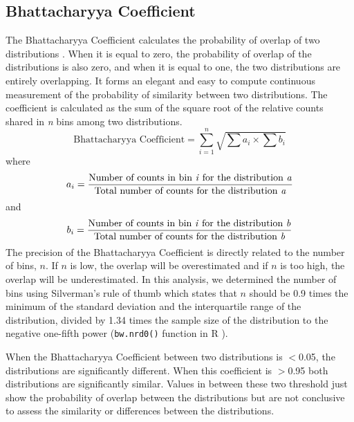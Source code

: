 \documentclass[12pt,letterpaper]{article}
\begin{document}
\subsection{Bhattacharyya Coefficient}
The Bhattacharyya Coefficient calculates the probability of overlap of two distributions \citep{Bhattacharyya}. When it is equal to zero, the probability of overlap of the distributions is also zero, and when it is equal to one, the two distributions are entirely overlapping. It forms an elegant and easy to compute continuous measurement of the probability of similarity between two distributions. The coefficient is calculated as the sum of the square root of the relative counts shared in \textit{n} bins among two distributions.
\begin{equation}
\text{Bhattacharyya Coefficient}=\sum_{i=1}^{n} \sqrt{{\sum{a_i}}\times{\sum{b_i}}}
\end{equation}
where
\begin{equation}
{a_i}=\frac{\text{Number of counts in bin \textit{i} for the distribution \textit{a}}}{\text{Total number of counts for the distribution \textit{a}}}
\end{equation}
and
\begin{equation}
{b_i}=\frac{\text{Number of counts in bin \textit{i} for the distribution \textit{b}}}{\text{Total number of counts for the distribution \textit{b}}}
\end{equation}
The precision of the Bhattacharyya Coefficient is directly related to the number of bins, $n$. If $n$ is low, the overlap will be overestimated and if $n$ is too high, the overlap will be underestimated. In this analysis, we determined the number of bins using Silverman's rule of thumb which states that $n$ should be 0.9 times the minimum of the standard deviation and the interquartile range of the distribution, divided by 1.34 times the sample size of the distribution to the negative one-fifth power (\texttt{bw.nrd0()} function in R \citep{silverman1986density}).

When the Bhattacharyya Coefficient between two distributions is $<$0.05, the distributions are significantly different.
When this coefficient is $>$0.95 both distributions are significantly similar.
Values in between these two threshold just show the probability of overlap between the distributions but are not conclusive to assess the similarity or differences between the distributions.
\end{document}
